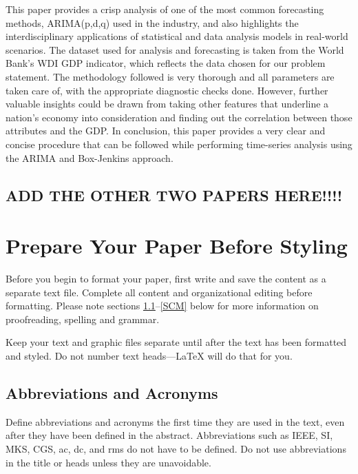 \documentclass[conference]{IEEEtran}
\begin{document}
This paper provides a crisp analysis of one of the most common forecasting methods, ARIMA(p,d,q) used in the industry, and also highlights the interdisciplinary applications of statistical and data analysis models in real-world scenarios. The dataset used for analysis and forecasting is taken from the World Bank’s WDI GDP indicator, which reflects the data chosen for our problem statement. The methodology followed is very thorough and all parameters are taken care of, with the appropriate diagnostic checks done. However, further valuable insights could be drawn from taking other features that underline a nation’s economy into consideration and finding out the correlation between those attributes and the GDP. In conclusion, this paper provides a very clear and concise procedure that can be followed while performing time-series analysis using the ARIMA and Box-Jenkins approach.

\begin{comment}
The IEEEtran class file is used to format your paper and style the text. All margins, 
column widths, line spaces, and text fonts are prescribed; please do not 
alter them. You may note peculiarities. For example, the head margin
measures proportionately more than is customary. This measurement 
and others are deliberate, using specifications that anticipate your paper 
as one part of the entire proceedings, and not as an independent document. 
Please do not revise any of the current designations.
\end{comment}

\subsection{\textbf{ADD THE OTHER TWO PAPERS HERE!!!!}}

\section{Prepare Your Paper Before Styling}
Before you begin to format your paper, first write and save the content as a 
separate text file. Complete all content and organizational editing before 
formatting. Please note sections \ref{AA}--\ref{SCM} below for more information on 
proofreading, spelling and grammar.

Keep your text and graphic files separate until after the text has been 
formatted and styled. Do not number text heads---{\LaTeX} will do that 
for you.

\subsection{Abbreviations and Acronyms}\label{AA}
Define abbreviations and acronyms the first time they are used in the text, 
even after they have been defined in the abstract. Abbreviations such as 
IEEE, SI, MKS, CGS, ac, dc, and rms do not have to be defined. Do not use 
abbreviations in the title or heads unless they are unavoidable.
\end{document}
